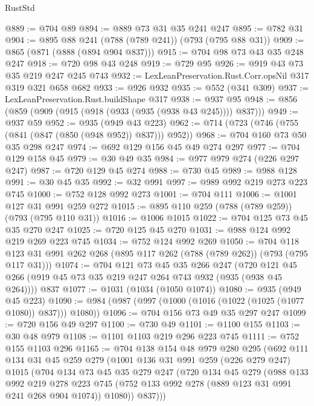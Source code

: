 \begin{lexlean}{RustStd}
\begin{coremodule}
@889 := @704 @89
@894 := @889 @73 @31 @35 @241 @247
@895 := @782 @31
@904 := @895 @88 @241 (@788 (@789 @241)) (@793 (@795 @88 @31))
@909 := @865 (@871 (@888 (@894 @904 @837)))
@915 := @704 @98 @73 @43 @35 @248 @247
@918 := @720 @98 @43 @248
@919 := @729 @95
@926 := @919 @43 @73 @35 @219 @247 @245 @743
@932 := LexLeanPreservation.Rust.Corr.opsNil @317 @319 @321 @658 @682
@933 := @926 @932
@935 := @552 (@341 @309)
@937 := LexLeanPreservation.Rust.buildShape @317
@938 := @937 @95
@948 := @856 (@859 (@909 (@915 (@918 (@933 (@935 (@938 @43 @245)))) @837)))
@949 := @937 @59
@952 := @935 (@949 @43 @223)
@962 := @714 (@723 (@746 (@755 (@841 (@847 (@850 (@948 @952)) @837))) @952))
@968 := @704 @160 @73 @50 @35 @298 @247
@974 := @692 @129 @156 @45 @49 @274 @297
@977 := @704 @129 @158 @45
@979 := @30 @49 @35
@984 := @977 @979 @274 (@226 @297 @247)
@987 := @720 @129 @45 @274
@988 := @730 @45
@989 := @988 @128
@991 := @30 @45 @35
@992 := @32 @991
@997 := @989 @992 @219 @273 @223 @745
@1000 := @752 @128 @992 @273
@1001 := @704 @111
@1006 := @1001 @127 @31 @991 @259 @272
@1015 := @895 @110 @259 (@788 (@789 @259)) (@793 (@795 @110 @31))
@1016 := @1006 @1015
@1022 := @704 @125 @73 @45 @35 @270 @247
@1025 := @720 @125 @45 @270
@1031 := @988 @124 @992 @219 @269 @223 @745
@1034 := @752 @124 @992 @269
@1050 := @704
    @118
    @123
    @31
    @991
    @262
    @268
    (@895 @117 @262 (@788 (@789 @262)) (@793 (@795 @117 @31)))
@1074 := @704
    @121
    @73
    @45
    @35
    @266
    @247
    (@720 @121 @45 @266 (@919 @45 @73 @35 @219 @247 @264 @743 @932 (@935 (@938 @45 @264))))
    @837
@1077 := @1031 (@1034 (@1050 @1074))
@1080 := @935 (@949 @45 @223)
@1090 := @984 (@987 (@997 (@1000 (@1016 (@1022 (@1025 (@1077 @1080)) @837))) @1080))
@1096 := @704 @156 @73 @49 @35 @297 @247
@1099 := @720 @156 @49 @297
@1100 := @730 @49
@1101 := @1100 @155
@1103 := @30 @48 @979
@1108 := @1101 @1103 @219 @296 @223 @745
@1111 := @752 @155 @1103 @296
@1165 := @704
    @138
    @154
    @48
    @979
    @280
    @295
    (@692
      @111
      @134
      @31
      @45
      @259
      @279
      (@1001
        @136
        @31
        @991
        @259
        (@226 @279 @247)
        @1015
        (@704
          @134
          @73
          @45
          @35
          @279
          @247
          (@720
            @134
            @45
            @279
            (@988
              @133
              @992
              @219
              @278
              @223
              @745
              (@752 @133 @992 @278 (@889 @123 @31 @991 @241 @268 @904 @1074))
              @1080))
          @837)))

\end{coremodule}
\end{lexlean}
